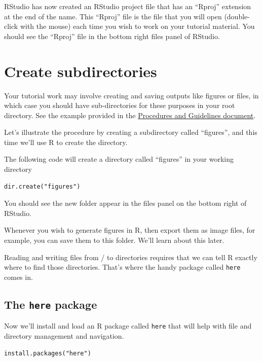 \documentclass[
]{book}
\begin{document}
RStudio has now created an RStudio project file that has an ``Rproj'' extension at the end of the name. This ``Rproj'' file is the file that you will open (double-click with the mouse) each time you wish to work on your tutorial material. You should see the ``Rproj'' file in the bottom right files panel of RStudio.

\section{Create subdirectories}\label{create_subdirs}

Your tutorial work may involve creating and saving outputs like figures or files, in which case you should have sub-directories for these purposes in your root directory. See the example provided in the \href{https://ubco-biology.github.io/Procedures-and-Guidelines/example-biol-116.html\#screenshot}{Procedures and Guidelines document}.

Let's illustrate the procedure by creating a subdirectory called ``figures'', and this time we'll use R to create the directory.

The following code will create a directory called ``figures'' in your working directory

\begin{verbatim}
dir.create("figures")
\end{verbatim}

You should see the new folder appear in the files panel on the bottom right of RStudio.

Whenever you wish to generate figures in R, then export them as image files, for example, you can save them to this folder. We'll learn about this later.

Reading and writing files from / to directories requires that we can tell R exactly where to find those directories. That's where the handy package called \texttt{here} comes in.

\subsection{\texorpdfstring{The \texttt{here} package}{The here package}}\label{here_package}

Now we'll install and load an R package called \texttt{here} that will help with file and directory management and navigation.

\begin{verbatim}
install.packages("here")
\end{verbatim}
\end{document}
